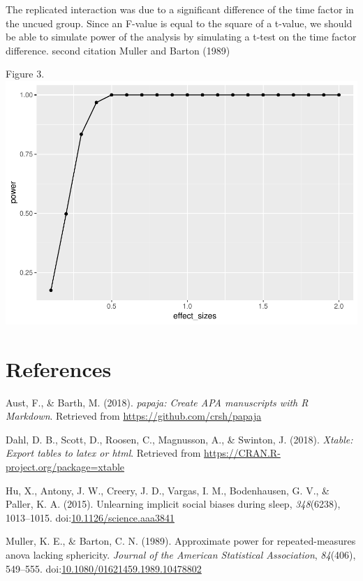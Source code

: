 \documentclass[man,floatsintext]{apa6}
\begin{document}
The replicated interaction was due to a significant difference of the
time factor in the uncued group. Since an F-value is equal to the square
of a t-value, we should be able to simulate power of the analysis by
simulating a t-test on the time factor difference. second citation
Muller and Barton (1989)

Figure 3.
\includegraphics{first_apa_files/figure-latex/unnamed-chunk-5-1.pdf}

\newpage

\section{References}\label{references}

\begingroup
\setlength{\parindent}{-0.5in} \setlength{\leftskip}{0.5in}

\hypertarget{refs}{}
\hypertarget{ref-R-papaja}{}
Aust, F., \& Barth, M. (2018). \emph{papaja: Create APA manuscripts with
R Markdown}. Retrieved from \url{https://github.com/crsh/papaja}

\hypertarget{ref-R-xtable}{}
Dahl, D. B., Scott, D., Roosen, C., Magnusson, A., \& Swinton, J.
(2018). \emph{Xtable: Export tables to latex or html}. Retrieved from
\url{https://CRAN.R-project.org/package=xtable}

\hypertarget{ref-Hu1013}{}
Hu, X., Antony, J. W., Creery, J. D., Vargas, I. M., Bodenhausen, G. V.,
\& Paller, K. A. (2015). Unlearning implicit social biases during sleep,
\emph{348}(6238), 1013--1015.
doi:\href{https://doi.org/10.1126/science.aaa3841}{10.1126/science.aaa3841}

\hypertarget{ref-Keith1989}{}
Muller, K. E., \& Barton, C. N. (1989). Approximate power for
repeated-measures anova lacking sphericity. \emph{Journal of the
American Statistical Association}, \emph{84}(406), 549--555.
doi:\href{https://doi.org/10.1080/01621459.1989.10478802}{10.1080/01621459.1989.10478802}
\end{document}

